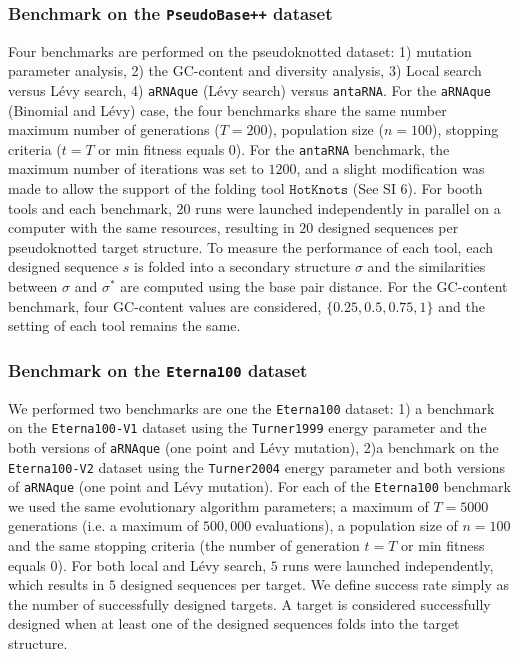 \subsubsection*{Benchmark on the \texttt{PseudoBase++} dataset}
Four benchmarks are performed on the pseudoknotted dataset: 1) mutation parameter analysis, 2) the GC-content and diversity analysis, 3) Local search versus Lévy search, 4) \texttt{aRNAque} (Lévy search) versus \texttt{antaRNA}. For the \texttt{aRNAque} (Binomial and Lévy) case, the four benchmarks share the same number maximum number of generations ($T=200$), population size ($n=100$), stopping criteria ($t=T$ or min fitness equals $0$).
For the \texttt{antaRNA} benchmark, the maximum number of iterations was set to $1200$, and a slight modification was made to allow the support of the folding tool $\texttt{HotKnots}$ (See SI 6).  
For booth tools and each benchmark,  $20$ runs were launched independently in parallel on a computer with the same resources, resulting in $20$ designed sequences per pseudoknotted target structure. To measure the performance of each tool, each designed sequence $s$ is folded into a secondary structure $\sigma$ and the similarities between $\sigma$ and $\sigma^*$ are computed using the base pair distance. 
For the GC-content benchmark, four GC-content values are considered, $\{0.25, 0.5, 0.75,1\}$ and the setting of each tool remains the same.
\subsubsection*{Benchmark on the \texttt{Eterna100} dataset}
We performed two benchmarks are one the \texttt{Eterna100} dataset: 1) a benchmark on the \texttt{Eterna100-V1} dataset using the \texttt{Turner1999} energy parameter and the both versions of \texttt{aRNAque} (one point and Lévy mutation), 2)a benchmark on the \texttt{Eterna100-V2} dataset using the \texttt{Turner2004} energy parameter and both versions of \texttt{aRNAque} (one point and Lévy mutation).
For each of the \texttt{Eterna100} benchmark we used the same evolutionary algorithm parameters; a maximum of $T=5000$ generations (i.e. a maximum of  $500,000$ evaluations), a population size of $n=100$ and the same stopping criteria (the number of generation $t=T$ or min fitness equals $0$). For both local and Lévy search, $5$ runs were launched independently, which results in $5$ designed sequences per target. We define success rate simply as the number of successfully designed targets. A target is considered successfully designed when at least one of the designed sequences folds into the target structure.

